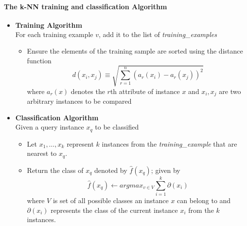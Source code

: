 \documentclass[a4paper,12pt]{report}
\begin{document}
			\begin{mdframed}[]
				\paragraph{The k-NN training and classification Algorithm \cite{Mitchell1997}}
				\begin{itemize}
					\item \textbf{Training Algorithm}
					\\ For each training example $v$, add it to the list of \textit{training\_examples}
						\begin{itemize}
							\item Ensure the elements of the training sample are sorted using the distance function
								\begin{equation}
									d(x_i,x_j) \equiv \sqrt{\sum_{r=1}^{n}(a_r(x_i) - a_r(x_j))^2} 
								\end{equation}
							where $a_r(x)$ denotes the $r$th attribute of instance $x$ and $x_i,x_j$ are two arbitrary instances to be compared
						\end{itemize}
					
					\item \textbf{Classification Algorithm} 
					\\ Given a query instance $x_{q}$ to be classified
					\begin{itemize}
						\item[] Let $x_1,\dots,x_k$ represent $k$ instances from the \textit{training\_example} that are nearest to $x_q$.
						
						\item Return the class of $x_q$ denoted by $\hat{f}(x_q)$; given by
							\begin{equation}
								\hat{f}(x_q) \leftarrow argmax_{v \in V} \sum_{i=1}^{k} \partial (x_i)
							\end{equation}
						where $V$ is set of all possible classes an instance $x$ can belong to and $\partial(x_i)$ represents the class of the current instance $x_i$ from the $k$ instances.
					\end{itemize}
				\end{itemize}
			\end{mdframed} 
		
\end{document}
